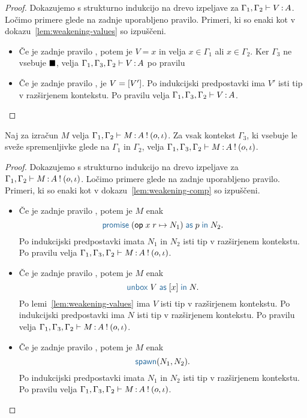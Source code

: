 \begin{proof}
	Dokazujemo s strukturno indukcijo na drevo izpeljave za $\Gamma_1, \Gamma_2 \vdash V \mathinner{:} A$.
	Ločimo primere glede na zadnje uporabljeno pravilo.
	Primeri, ki so enaki kot v dokazu~\ref{lem:weakening-values} so izpuščeni.
	
	\begin{itemize}
		\item Če je zadnje pravilo , potem je $V = x$ in velja $x \in \Gamma_1$ ali $x \in \Gamma_2$.
		Ker $\Gamma_3$ ne vsebuje $\blacksquare$, velja $\Gamma_1, \Gamma_3, \Gamma_2 \vdash V \mathinner{:} A$ po pravilu 
		
		\item Če je zadnje pravilo , je $V = [V']$. Po indukcijski predpostavki ima $V'$ isti tip v razširjenem kontekstu.
		Po pravilu  velja $\Gamma_1, \Gamma_3, \Gamma_2 \vdash V \mathinner{:} A$.
		
	\end{itemize}
\end{proof}

\begin{lema}\label{lem:weakening-comp-2}
	Naj za izračun $M$ velja $\Gamma_1, \Gamma_2 \vdash M \mathinner{:} A \mathbin{!} (o, \iota)$. Za vsak kontekst $\Gamma_3$, ki vsebuje le sveže spremenljivke glede na $\Gamma_1$ in $\Gamma_2$, velja $\Gamma_1, \Gamma_3, \Gamma_2 \vdash M \mathinner{:} A \mathbin{!} (o, \iota)$.
\end{lema}

\begin{proof}
	Dokazujemo s strukturno indukcijo na drevo izpeljave za $\Gamma_1, \Gamma_2 \vdash M \mathinner{:} A \mathbin{!} (o, \iota)$.
	Ločimo primere glede na zadnje uporabljeno pravilo.
	Primeri, ki so enaki kot v dokazu~\ref{lem:weakening-comp} so izpuščeni.
	
	\begin{itemize}
		\item Če je zadnje pravilo , potem je $M$ enak $$\tmwithrec{op}{x}{r}{N_1}{p}{N_2}.$$
		Po indukcijski predpostavki imata $N_1$ in $N_2$ isti tip v razširjenem kontekstu.
		Po pravilu  velja $\Gamma_1, \Gamma_3, \Gamma_2 \vdash M \mathinner{:} A \mathbin{!} (o, \iota)$.
		
		\item Če je zadnje pravilo , potem je $M$ enak $$\tmunbox{V}{x}{N}.$$
		Po lemi~\ref{lem:weakening-values} ima $V$ isti tip v razširjenem kontekstu.
		Po indukcijski predpostavki ima $N$ isti tip v razširjenem kontekstu.
		Po pravilu  velja $\Gamma_1, \Gamma_3, \Gamma_2 \vdash M \mathinner{:} A \mathbin{!} (o, \iota)$.
		
		\item Če je zadnje pravilo , potem je $M$ enak $$\tmspawn{N_1}{N_2}.$$
		Po indukcijski predpostavki imata $N_1$ in $N_2$ isti tip v razširjenem kontekstu.
		Po pravilu  velja $\Gamma_1, \Gamma_3, \Gamma_2 \vdash M \mathinner{:} A \mathbin{!} (o, \iota)$.
		
	\end{itemize}
\end{proof}


